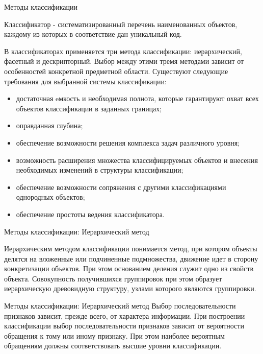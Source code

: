 \documentclass{beamer}
\begin{document}
\begin{frame}{Методы классификации} 

Классификатор -  систематизированный перечень наименованных объектов, каждому из которых в соответствие дан уникальный код.  

В классификаторах применяется три метода классификации: иерархический, фасетный и дескрипторный. 
Выбор между этими тремя методами зависит от особенностей конкретной предметной области. 
Существуют следующие требования для выбранной системы классификации:

\begin{itemize}
 \item достаточная eмкость и необходимая полнота, которые гарантируют охват всех объектов классификации в заданных границах;
 \item оправданная глубина;
 \item обеспечение возможности решения комплекса задач различного уровня;
 \item возможность расширения множества классифицируемых объектов и внесения необходимых изменений в структуры классификации;
 \item обеспечение возможности сопряжения с другими классификациями однородных объектов;
 \item обеспечение простоты ведения классификатора.

\end{itemize}
 

\end{frame}

\begin{frame}{Методы классификации: Иерархический метод} 

Иерархическим методом классификации понимается метод, при котором  объекты делятся  
на вложенные или подчиненные подмножества, движение идет в сторону конкретизации 
объектов. При этом основанием деления служит  одно из свойств объекта. 
Совокупность получившихся группировок при этом образует иерархическую древовидную структуру, узлами которого являются группировки.
\end{frame}

\begin{frame}{Методы классификации: Иерархический метод} 
Выбор последовательности признаков зависит, прежде всего, от характера информации. 
При построении классификации выбор последовательности признаков зависит 
от вероятности обращения к тому или иному признаку. 
При этом наиболее вероятным обращениям должны соответствовать высшие уровни классификации.
\end{frame}
\end{document}
